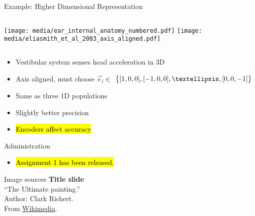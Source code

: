 \documentclass[handout,aspectratio=169]{beamer}
\begin{document}
\begin{frame}{Example: Higher Dimensional Representation}
	\begin{columns}[b]
		\centering
		\texttt{[image: media/ear\_internal\_anatomy\_numbered.pdf]}
		\centering
		\texttt{[image: media/eliasmith\_et\_al\_2003\_axis\_aligned.pdf]}%
	\end{columns}
	\begin{multicols}{2}
		\begin{itemize}
			\item Vestibular system senses head acceleration in 3D
			\item Axis aligned, must choose $\vec e_i \in$
			$\big\{ [1, 0, 0], [-1, 0, 0], \textellipsis, [0, 0, -1] \big\}$
			\columnbreak
			\item Same as three 1D populations
			\item Slightly better precision
			\item<2-> \hl{Encoders affect accuracy}
		\end{itemize}
	\end{multicols}
\end{frame}

\backupbegin

\begin{frame}{Administration}
	\begin{itemize}
		\setlength{\itemsep}{0.75cm}
		\item \hl{Assignment 1 has been released.}\\[0.25cm]
	\end{itemize}
\end{frame}

\begin{frame}[noframenumbering]{Image sources}
	\small
	\textbf{Title slide}\\\enquote{The Ultimate painting.}\\Author: Clark Richert.\\From \href{https://commons.wikimedia.org/wiki/File:\%22The_Ultimate_painting\%22.jpg}{Wikimedia}.
\end{frame}


\backupend
\end{document}
